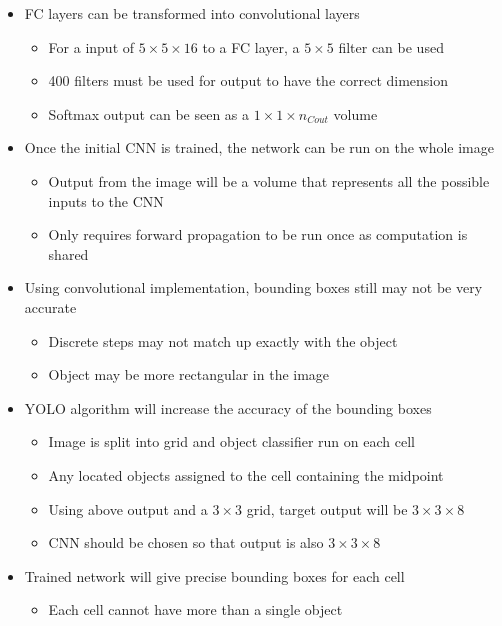 \documentclass[12pt, letterpaper]{article}
\begin{document}
\begin{itemize}
        \item FC layers can be transformed into convolutional layers
        \begin{itemize}
            \item For a input of $5\times 5\times 16$ to a FC layer, a $5\times 5$ filter can be used
            \item 400 filters must be used for output to have the correct dimension
            \item Softmax output can be seen as a $1\times 1\times n_{Cout}$ volume
        \end{itemize}
        \item Once the initial CNN is trained, the network can be run on the whole image
        \begin{itemize}
            \item Output from the image will be a volume that represents all the possible inputs to the CNN
            \item Only requires forward propagation to be run once as computation is shared
        \end{itemize}
        \item Using convolutional implementation, bounding boxes still may not be very accurate
        \begin{itemize}
            \item Discrete steps may not match up exactly with the object
            \item Object may be more rectangular in the image
        \end{itemize}
        \item YOLO algorithm will increase the accuracy of the bounding boxes
        \begin{itemize}
            \item Image is split into grid and object classifier run on each cell
            \item Any located objects assigned to the cell containing the midpoint
            \item Using above output and a $3\times 3$ grid, target output will be $3\times 3\times 8$
            \item CNN should be chosen so that output is also $3\times 3\times 8$
        \end{itemize}
        \item Trained network will give precise bounding boxes for each cell
        \begin{itemize}
            \item Each cell cannot have more than a single object

\end{itemize}
\end{itemize}
\end{document}
